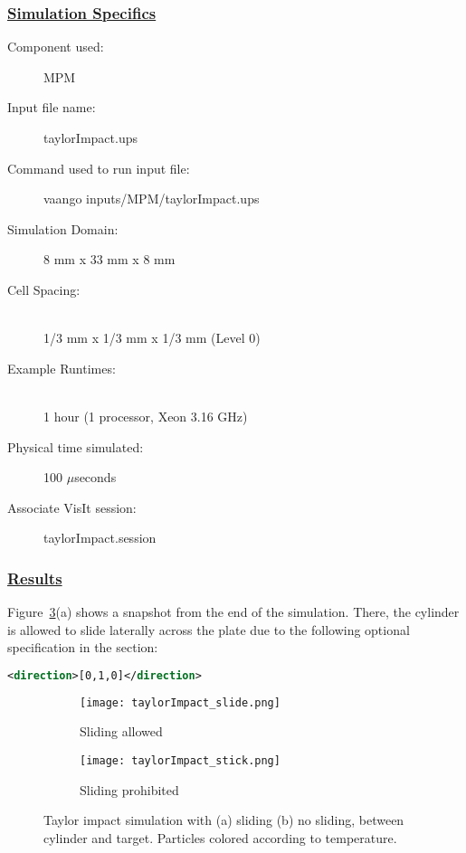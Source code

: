 \subsubsection*{\underline{Simulation Specifics}}
\begin{description} 
\item [Component used:] \hfill MPM
\item [Input file name:] \hfill taylorImpact.ups
\item [Command used to run input file:]\hfill vaango inputs/MPM/taylorImpact.ups
\item [Simulation Domain:]\hfill 8 mm x 33 mm x 8 mm

\item [Cell Spacing:]\hfill \\ 
  1/3 mm x 1/3 mm x 1/3 mm (Level 0)

\item [Example Runtimes:] \hfill \\
  1 hour   (1 processor, Xeon 3.16 GHz)\\

\item [Physical time simulated:] \hfill 100 $\mu$seconds

\item [Associate VisIt session:] \hfill taylorImpact.session

\end{description}

\subsubsection*{\underline{Results}}
Figure~\ref{fig:taylorImpact}(a) shows a snapshot from the end of the simulation.
There, the cylinder is allowed to slide laterally across the plate due
to the following optional specification in the 
section:

\begin{lstlisting}[language=XML]
        <direction>[0,1,0]</direction>
\end{lstlisting}

\begin{figure}
  \centering
  \begin{subfigure}{0.4\textwidth}
    \centering
    \texttt{[image: taylorImpact\_slide.png]}
    \label{fig:taylorImpact_slide}
    \caption{Sliding allowed}
  \end{subfigure}
  \begin{subfigure}{0.4\textwidth}
    \centering
    \texttt{[image: taylorImpact\_stick.png]}
    \label{fig:taylorImpact_stick}
    \caption{Sliding prohibited}
  \end{subfigure}
  \caption{Taylor impact simulation with (a) sliding (b) no sliding,
           between cylinder and
           target.  Particles colored according to temperature.}
  \label{fig:taylorImpact}
\end{figure}

